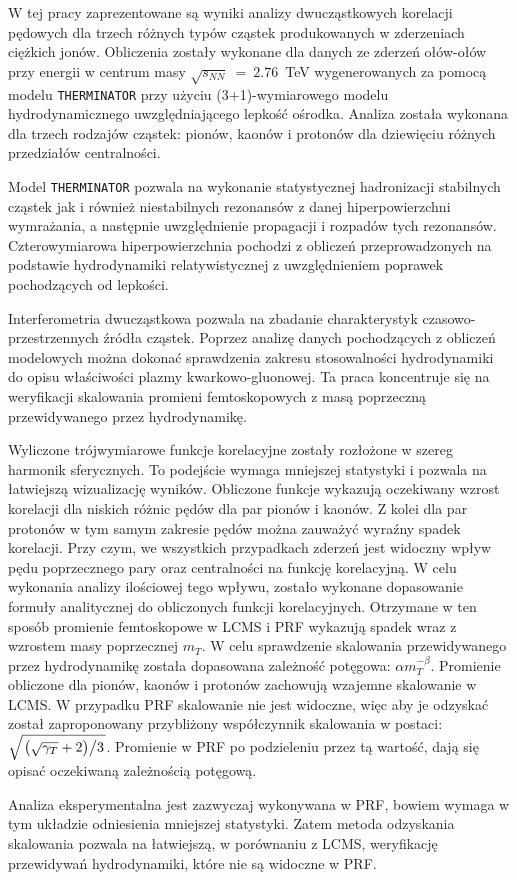 
W tej pracy zaprezentowane są wyniki analizy dwucząstkowych korelacji pędowych dla trzech różnych typów cząstek produkowanych w zderzeniach ciężkich jonów.
Obliczenia zostały wykonane dla danych ze zderzeń ołów-ołów przy energii w centrum masy $\sqrt{s_{NN}}~=~2.76$~TeV wygenerowanych za pomocą modelu \verb|THERMINATOR| przy użyciu (3+1)-wymiarowego modelu hydrodynamicznego uwzględniającego lepkość ośrodka.
Analiza została wykonana dla trzech rodzajów cząstek: pionów, kaonów i protonów dla dziewięciu różnych przedziałów centralności.

Model \verb|THERMINATOR| pozwala na wykonanie statystycznej hadronizacji stabilnych cząstek jak i również niestabilnych rezonansów z danej hiperpowierzchni wymrażania, a następnie uwzględnienie propagacji i rozpadów tych rezonansów.
Czterowymiarowa hiperpowierzchnia pochodzi z obliczeń przeprowadzonych na podstawie hydrodynamiki relatywistycznej z uwzględnieniem poprawek pochodzących od lepkości.

Interferometria dwucząstkowa pozwala na zbadanie charakterystyk czasowo-przestrzennych źródła cząstek.
Poprzez analizę danych pochodzących z obliczeń modelowych można dokonać sprawdzenia zakresu stosowalności hydrodynamiki do opisu właściwości plazmy kwarkowo-gluonowej.
Ta praca koncentruje się na weryfikacji skalowania promieni femtoskopowych z masą poprzeczną przewidywanego przez hydrodynamikę.

Wyliczone trójwymiarowe funkcje korelacyjne zostały rozłożone w szereg harmonik sferycznych.
To podejście wymaga mniejszej statystyki i pozwala na łatwiejszą wizualizację wyników.
Obliczone funkcje wykazują oczekiwany wzrost korelacji dla niskich różnic pędów dla par pionów i kaonów.
Z kolei dla par protonów w tym samym zakresie pędów można zauważyć wyraźny spadek korelacji.
Przy czym, we wszystkich przypadkach zderzeń jest widoczny wpływ pędu poprzecznego pary oraz centralności na funkcję korelacyjną.
W celu wykonania analizy ilościowej tego wpływu, zostało wykonane dopasowanie formuły analitycznej do obliczonych funkcji korelacyjnych.
Otrzymane w ten sposób promienie femtoskopowe w LCMS i PRF wykazują spadek wraz z wzrostem masy poprzecznej $m_T$.
W celu sprawdzenie skalowania przewidywanego przez hydrodynamikę została dopasowana zależność potęgowa: $\alpha m_T^{-\beta}$.
Promienie obliczone dla pionów, kaonów i protonów zachowują wzajemne skalowanie w LCMS.
W przypadku PRF skalowanie nie jest widoczne, więc aby je odzyskać został zaproponowany przybliżony współczynnik skalowania w postaci: $\sqrt{ \left. \left( \sqrt{\gamma_T} + 2 \right) \middle/ 3 \right. }$.
Promienie w PRF po podzieleniu przez tą wartość, dają się opisać oczekiwaną zależnością potęgową.

Analiza eksperymentalna jest zazwyczaj wykonywana w PRF, bowiem wymaga w tym układzie odniesienia mniejszej statystyki.
Zatem metoda odzyskania skalowania pozwala na łatwiejszą, w porównaniu z LCMS, weryfikację przewidywań hydrodynamiki, które nie są widoczne w PRF.